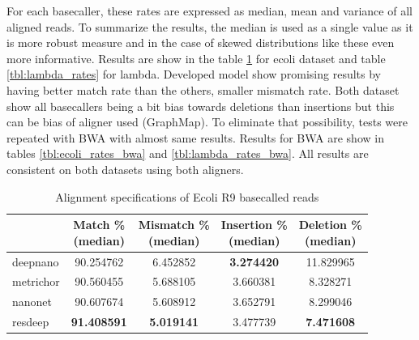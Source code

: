 \documentclass[times, utf8, diplomski, numeric, english]{fer}
\begin{document}
For each basecaller, these rates are expressed as median, mean and variance of all aligned reads. To summarize the results, the median is used as a single value as it is more robust measure and in the case of skewed distributions like these even more informative.  Results are show in the table \ref{tbl:ecoli_rates} for ecoli dataset and table \ref{tbl:lambda_rates} for lambda. 
Developed model show promising results by having better match rate than the others, smaller mismatch rate. Both dataset show all basecallers being a bit bias towards deletions than insertions but this can be bias of aligner used (GraphMap). To eliminate that possibility, tests were repeated with BWA with almost same results. Results for BWA are show in tables
\ref{tbl:ecoli_rates_bwa} and \ref{tbl:lambda_rates_bwa}.
All results are consistent on both datasets using both aligners.





\begin{table}[htb]
	\caption{Alignment specifications of Ecoli R9 basecalled reads}
	\label{tbl:ecoli_rates}
	\centering
	\begin{tabular}{lcccc}
		\toprule
		{} &  \thead{Match \% \\(median)} &  \thead{Mismatch \% \\(median)} &  \thead{Insertion \% \\(median)} &  \thead{Deletion \% \\(median)} \\
		\midrule
		
		deepnano   &                  90.254762 &                      6.452852 &                       \textbf{3.274420} &                     11.829965 \\
		metrichor  &                  90.560455 &                      5.688105 &                       3.660381 &                      8.328271 \\
		nanonet    &                  90.607674 &                      5.608912 &                       3.652791 &                      8.299046 \\
		resdeep    &                  \textbf{91.408591} &                     \textbf{ 5.019141} &                       3.477739 &                      \textbf{7.471608 }\\
		\bottomrule
	\end{tabular}
\end{table}
\end{document}
